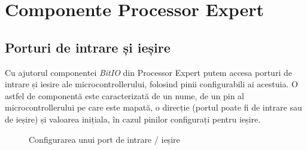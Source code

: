 \chapter{Componente Processor Expert}

\section{Porturi de intrare și ieșire}
Cu ajutorul componentei \textit{BitIO} din Processor Expert putem accesa porturi de intrare și iesire ale microcontrollerului, folosind pinii configurabili ai acestuia. O astfel de componentă este caracterizată de un nume, de un pin al microcontrollerului pe care este mapată, o direcție (portul poate fi de intrare sau de ieșire) și valoarea inițiala, în cazul pinilor configurați pentru ieșire. 

\begin{figure}[h!]
  \vspace{-20pt}
  \vspace{-15pt}
  \caption{\label{fig:CodeWarrior-BitIO} Configurarea unui port de intrare / ieșire}
  \vspace{-20pt}
\end{figure}